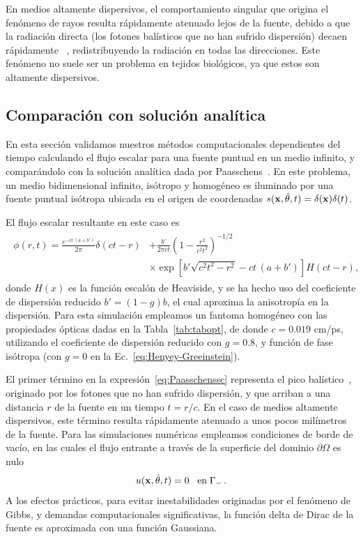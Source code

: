 En medios altamente dispersivos, el comportamiento singular 
que origina el fenómeno de rayos resulta rápidamente atenuado lejos 
de la fuente, debido a que la radiación directa 
(los fotones balísticos que no han sufrido dispersión) decaen rápidamente
~\cite{Ramankutty1997}, redistribuyendo la radiación en todas las 
direcciones. Este fenómeno no suele ser un problema en tejidos biológicos, 
ya que estos son altamente dispersivos.

\subsection{Comparación con solución analítica}

En esta sección validamos nuestros métodos computacionales 
dependientes del tiempo calculando el flujo escalar
para una fuente puntual en un medio infinito, 
y comparándolo con la solución analítica dada por 
Paasschens~\cite{Paasschens1997}. 
En este problema, un medio bidimensional infinito, 
isótropo y homogéneo es iluminado por una fuente puntual isótropa
ubicada en el origen de coordenadas $s(\mathbf{x},\hat{\theta},t)=\delta(\mathbf{x})\delta(t)$.

El flujo escalar resultante en este caso es 
\begin{equation}
\begin{split}
\begin{aligned}
\phi(r,t)=\frac{e^{-c t \, (a+b')}}{2\pi}\delta(ct-r)&+\frac{b'}{2\pi c t}\left(1-\frac{r^2}{c^2t^2}\right)^{-1/2}\\
&\times\exp\left[b'\sqrt{c^2t^2-r^2}-c t \, (a+b')\right]H(ct-r),
\end{aligned}
\end{split}
\label{eq:Paasschenssc}
\end{equation}
donde $H(x)$ es la función escalón de Heaviside, 
y se ha hecho uso del coeficiente de dispersión reducido $b'=(1-g)b$, 
el cual aproxima la anisotropía en la dispersión.
Para esta simulación empleamos un fantoma homogéneo con las propiedades ópticas 
dadas en la Tabla~\ref{tab:tabopt}, de donde $c=0.019$ cm/ps, 
utilizando el coeficiente de dispersión reducido con $g=0.8$, y función de fase isótropa (con $g=0$ en la Ec.~\eqref{eq:Henyey-Greeinstein}). 


El primer término en la expresión~\eqref{eq:Paasschenssc} 
representa el pico balístico~\cite{Paasschens1997}, originado 
por los fotones que no han sufrido dispersión, y que arriban a una distancia $r$
 de la fuente en un tiempo $t=r/c$.
En el caso de medios altamente dispersivos, este término resulta rápidamente atenuado 
a unos pocos milímetros de la fuente. Para las simulaciones numéricas 
empleamos condiciones de borde de vacío, en las cuales el flujo 
entrante a través de la superficie del dominio $\partial \Omega$ es nulo 
\begin{equation}
u(\mathbf{x},\hat{\theta},t)=0 \;\;\; \text{en}\; \Gamma_{-} \, .
\label{eq:vacuumbc}
\end{equation}
A los efectos prácticos, para evitar inestabilidades originadas 
por el fenómeno de Gibbs, y demandas computacionales significativas, 
la función delta de Dirac de la fuente es aproximada con una función Gaussiana.

